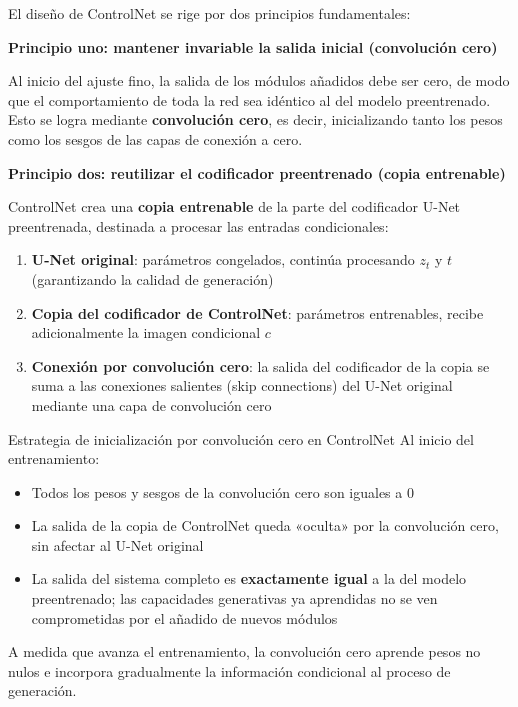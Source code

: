 El diseño de ControlNet se rige por dos principios fundamentales:

\textbf{Principio uno: mantener invariable la salida inicial (convolución cero)}

Al inicio del ajuste fino, la salida de los módulos añadidos debe ser cero, de modo que el comportamiento de toda la red sea idéntico al del modelo preentrenado. Esto se logra mediante \textbf{convolución cero}, es decir, inicializando tanto los pesos como los sesgos de las capas de conexión a cero.

\textbf{Principio dos: reutilizar el codificador preentrenado (copia entrenable)}

ControlNet crea una \textbf{copia entrenable} de la parte del codificador U-Net preentrenada, destinada a procesar las entradas condicionales:

\begin{enumerate}
    \item \textbf{U-Net original}: parámetros congelados, continúa procesando $z_t$ y $t$ (garantizando la calidad de generación)
    \item \textbf{Copia del codificador de ControlNet}: parámetros entrenables, recibe adicionalmente la imagen condicional $c$
    \item \textbf{Conexión por convolución cero}: la salida del codificador de la copia se suma a las conexiones salientes (skip connections) del U-Net original mediante una capa de convolución cero
\end{enumerate}

\begin{importantbox}{Estrategia de inicialización por convolución cero en ControlNet}
Al inicio del entrenamiento:
\begin{itemize}
    \item Todos los pesos y sesgos de la convolución cero son iguales a 0
    \item La salida de la copia de ControlNet queda «oculta» por la convolución cero, sin afectar al U-Net original
    \item La salida del sistema completo es \textbf{exactamente igual} a la del modelo preentrenado; las capacidades generativas ya aprendidas no se ven comprometidas por el añadido de nuevos módulos
\end{itemize}
A medida que avanza el entrenamiento, la convolución cero aprende pesos no nulos e incorpora gradualmente la información condicional al proceso de generación.
\end{importantbox}

